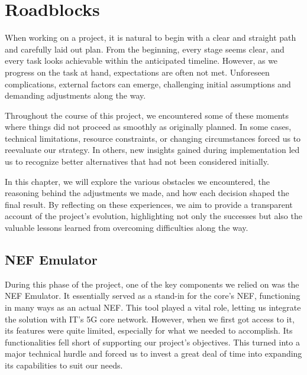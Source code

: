 \chapter{Roadblocks}

When working on a project, it is natural to begin with a clear and straight
path and carefully laid out plan. From the beginning, every stage seems clear,
and every task looks achievable within the anticipated timeline. However, as we
progress on the task at hand, expectations are often not met. Unforeseen
complications, external factors can emerge, challenging initial assumptions and
demanding adjustments along the way.

Throughout the course of this project, we encountered some of these moments
where things did not proceed as smoothly as originally planned. In some cases,
technical limitations, resource constraints, or changing circumstances forced
us to reevaluate our strategy. In others, new insights gained during
implementation led us to recognize better alternatives that had not been
considered initially.

In this chapter, we will explore the various obstacles we encountered, the
reasoning behind the adjustments we made, and how each decision shaped the
final result. By reflecting on these experiences, we aim to provide a
transparent account of the project’s evolution, highlighting not only the
successes but also the valuable lessons learned from overcoming difficulties
along the way.

\section{NEF Emulator}

During this phase of the project, one of the key components we relied on was
the NEF Emulator. It essentially served as a stand-in for the core’s NEF,
functioning in many ways as an actual NEF. This tool played a vital role,
letting us integrate the solution with IT's 5G core network. However, when we
first got access to it, its features were quite limited, especially for what we
needed to accomplish. Its functionalities fell short of supporting our
project’s objectives. This turned into a major technical hurdle and forced us
to invest a great deal of time into expanding its capabilities to suit our
needs.

